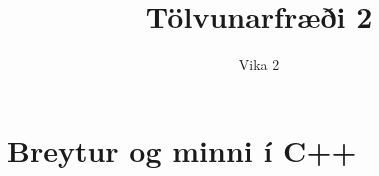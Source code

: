 \documentclass[handout]{beamer}
\title{Tölvunarfræði 2}
\subtitle{Vika 2}
\begin{document}
\begin{frame}
\titlepage
\end{frame}

% 
% 
% 

\section{Breytur og minni í C++}
\end{document}
